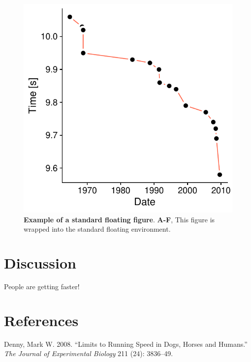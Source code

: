 \documentclass[10pt,]{article}
\begin{document}
\begin{figure}[ht]
\includegraphics[width=\textwidth]{../figures/m100-progression.pdf}
\caption{\color{Gray} \textbf{Example of a standard floating figure}. \textbf{A-F}, This figure is wrapped into the standard floating environment.}
\label{m100_2}
\end{figure}

\hypertarget{discussion}{%
\section{Discussion}\label{discussion}}

People are getting faster!

\hypertarget{references}{%
\section*{References}\label{references}}

\hypertarget{refs}{}
\leavevmode\hypertarget{ref-denny_limits_2008}{}%
Denny, Mark W. 2008. ``Limits to Running Speed in Dogs, Horses and Humans.'' \emph{The Journal of Experimental Biology} 211 (24): 3836--49.
\end{document}
